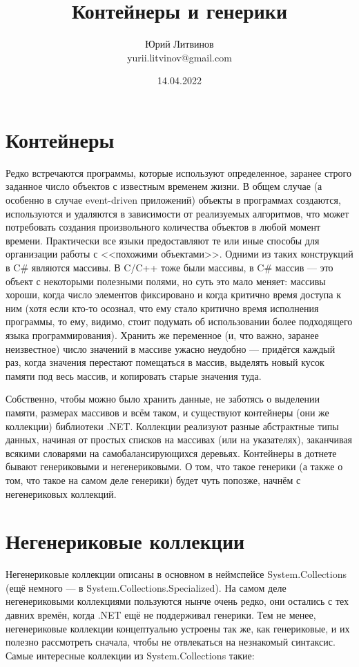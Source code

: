 \documentclass[a5paper]{article}
\title{Контейнеры и генерики}
\author{Юрий Литвинов\\\small{yurii.litvinov@gmail.com}}
\date{14.04.2022}
\begin{document}
\maketitle
\thispagestyle{empty}

\section{Контейнеры}

Редко встречаются программы, которые используют определенное, заранее строго заданное число объектов с известным временем жизни. В общем случае (а особенно в случае event-driven приложений) объекты в программах создаются, используются и удаляются в зависимости от реализуемых алгоритмов, что может потребовать создания произвольного количества объектов в любой момент времени. Практически все языки предоставляют те или иные способы для организации работы с <<похожими объектами>>. Одними из таких конструкций в C\# являются массивы. В C/C++ тоже были массивы, в C\# массив --- это объект с некоторыми полезными полями, но суть это мало меняет: массивы хороши, когда число элементов фиксировано и когда критично время доступа к ним (хотя если кто-то осознал, что ему стало критично время исполнения программы, то ему, видимо, стоит подумать об использовании более подходящего языка программирования). Хранить же переменное (и, что важно, заранее неизвестное) число значений в массиве ужасно неудобно --- придётся каждый раз, когда значения перестают помещаться в массив, выделять новый кусок памяти под весь массив, и копировать старые значения туда.

Собственно, чтобы можно было хранить данные, не заботясь о выделении памяти, размерах массивов и всём таком, и существуют контейнеры (они же коллекции) библиотеки .NET. Коллекции реализуют разные абстрактные типы данных, начиная от простых списков на массивах (или на указателях), заканчивая всякими словарями на самобалансирующихся деревьях. Контейнеры в дотнете бывают генериковыми и негенериковыми. О том, что такое генерики (а также о том, что такое на самом деле генерики) будет чуть попозже, начнём с негенериковых коллекций.

\section{Негенериковые коллекции}

Негенериковые коллекции описаны в основном в неймспейсе System.Collections (ещё немного --- в System.Collections.Specialized). На самом деле негенериковыми коллекциями пользуются нынче очень редко, они остались с тех давних времён, когда .NET ещё не поддерживал генерики. Тем не менее, негенериковые коллекции концептуально устроены так же, как генериковые, и их полезно рассмотреть сначала, чтобы не отвлекаться на незнакомый синтаксис. Самые интересные коллекции из System.Collections такие:
\end{document}
